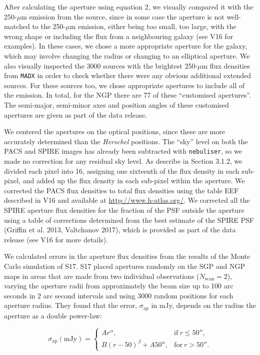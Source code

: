 \documentclass[a4paper,fleqn,usenatbib, twocolumn]{aastex61}
\begin{document}
After calculating the aperture using equation 2, we visually compared
it with the 250-$\mu$m emission from the source, since in some case
the aperture is not well-matched to the 250-$\mu$m emission, either
being too small, too large, with the wrong shape or including the flux
from a neighbouring galaxy (see V16 for examples).  In these cases, we
chose a more appropriate aperture for the galaxy, which may involve
changing the radius or changing to an elliptical aperture.  We also
visually inspected the 3000 sources with the brightest 250-$\mu$m flux
densities from {\tt MADX} in order to check whether there were any
obvious additional extended sources.  For these sources too, we chose
appropriate apertures to include all of the emission.  In total, for
the NGP there are 77 of these ``customised apertures''.  The
semi-major, semi-minor axes and position angles of these customised
apertures are given as part of the data release.

We centered the apertures on the optical positions, since these are
more accurately determined than the {\it Herschel} positions.  The
``sky'' level on both the PACS and SPIRE images has already been
subtracted with {\tt nebuliser}, so we made no correction for any
residual sky level.  As describe in Section 3.1.2, we divided each
pixel into 16, assigning one sixteenth of the flux density in each
sub-pixel, and added up the flux density in each sub-pixel within the
aperture.  We corrected the PACS flux densities to total flux
densities using the table EEF described in V16 and available at
\url{http://www.h-atlas.org/}.  We corrected all the SPIRE aperture
flux densities for the fraction of the PSF outside the aperture using
a table of corrections determined from the best estimate of the SPIRE
PSF (Griffin et al. 2013, Valtchanov 2017), which is provided as part
of the data release (see V16 for more details).


We calculated errors in the aperture flux densities from the results
of the Monte Carlo simulation of S17. S17 placed apertures randomly on
the SGP and NGP maps in areas that are made from two individual
observations ($N_{\mathrm{scan}}=2$), varying the aperture radii from
approximately the beam size up to 100 arc seconds in 2 arc second
intervals and using 3000 random positions for each aperture radius.
They found that the error, $\sigma_{\mathrm{ap}}$ in mJy, depends on
the radius the aperture as a double power-law:

\begin{equation}
  \sigma_{\mathrm{ap}}(\mathrm{mJy}) =
  \begin{cases}
      Ar^\alpha , &   \mathrm{if\ } r\le 50'' ,\\
      B(r-50)^\beta + A 50^\alpha , & \mathrm{for\ } r>50''.
    \end{cases}
\end{equation}
\end{document}
